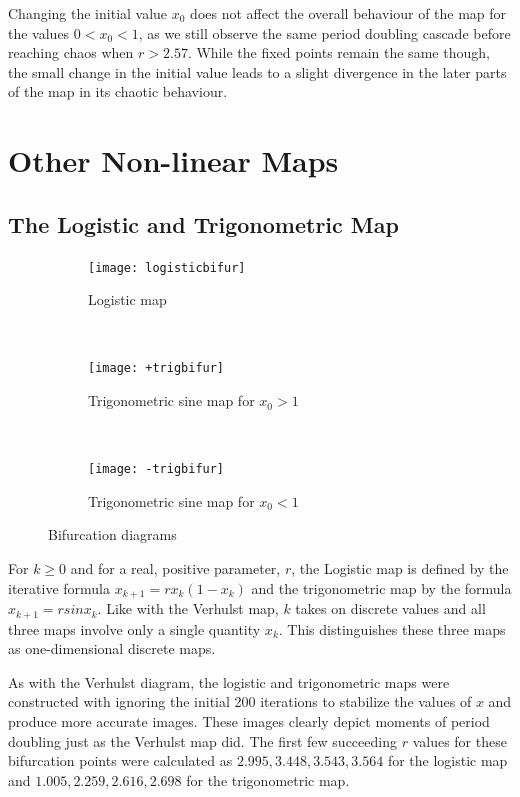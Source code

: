 \documentclass[a4paper]{article}
\begin{document}
Changing the initial value $ x_0 $ does not affect the overall behaviour of the map for the values $ 0 < x_0 < 1 $, as we still observe the same period doubling cascade before reaching chaos when $ r > 2.57 $. While the fixed points remain the same though, the small change in the initial value leads to a slight divergence in the later parts of the map in its chaotic behaviour.​


\section{Other Non-linear Maps}

\subsection{The Logistic and Trigonometric Map}
\begin{figure} [h]
    \centering
    \begin{subfigure}[b]{0.3\textwidth}
        \texttt{[image: logisticbifur]}
        \caption{Logistic map}
    \end{subfigure}%
    ~ %
    \begin{subfigure}[b]{0.3\textwidth}
        \texttt{[image: +trigbifur]}
        \caption{Trigonometric sine map for $x_0>1$}
    \end{subfigure}
    ~ %
    \begin{subfigure}[b]{0.3\textwidth}
        \texttt{[image: -trigbifur]}
        \caption{Trigonometric sine map for $x_0<1$}
    \end{subfigure}
    \caption{Bifurcation diagrams}\label{fig:animals}
\end{figure}
For $ k \geq 0$ and for a real, positive parameter, $r$, the Logistic map is defined by the iterative formula $x_{k+1} = rx_k(1-x_k)$ and the trigonometric map by the formula $x_{k+1} = rsinx_k$. Like with the Verhulst map, $k$ takes on discrete values and all three maps involve only a single quantity $x_k$. This distinguishes these three maps as one-dimensional discrete maps.

As with the Verhulst diagram, the logistic and trigonometric maps were constructed with ignoring the initial 200 iterations to stabilize the values of $x$ and produce more accurate images. These images clearly depict moments of period doubling just as the Verhulst map did. The first few succeeding $r$ values for these bifurcation points were calculated as $2.995, 3.448, 3.543, 3.564$ for the logistic map and $1.005, 2.259, 2.616, 2.698$ for the trigonometric map. 
\end{document}
